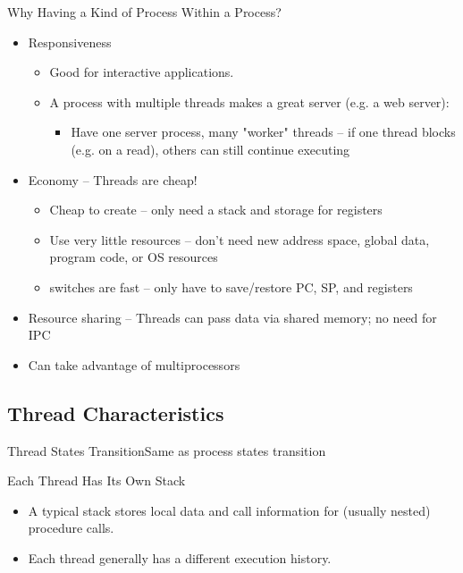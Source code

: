 \begin{frame}{Why Having a Kind of Process Within a Process?}{}
  \begin{itemize}
  \item Responsiveness
    \begin{itemize}
    \item Good for interactive applications.
    \item A process with multiple threads makes a great server (e.g. a web server):
      \begin{itemize}
      \item[] Have one server process, many "worker" threads -- if one thread blocks (e.g. on a
        read), others can still continue executing
      \end{itemize}
    \end{itemize}
  \item Economy -- Threads are cheap!
    \begin{itemize}
    \item Cheap to create -- only need a stack and storage for registers
    \item Use very little resources -- don't need new address space, global data, program code, or
      OS resources
    \item switches are fast -- only have to save/restore PC, SP, and registers
    \end{itemize}
  \item Resource sharing -- Threads can pass data via shared memory; no need for IPC
    \item Can take advantage of multiprocessors
  \end{itemize}
\end{frame}

\subsection{Thread Characteristics}
\label{sec:thread-char}

\begin{frame}{Thread States Transition}{Same as process states transition}
  \begin{center}
  \end{center}
\end{frame}

\begin{frame}{Each Thread Has Its Own Stack}
  \begin{itemize}
  \item A typical stack stores local data and call information for (usually nested) procedure
    calls. 
  \item Each thread generally has a different execution history.
  \end{itemize}
  \begin{center}
  \end{center}
\end{frame}

